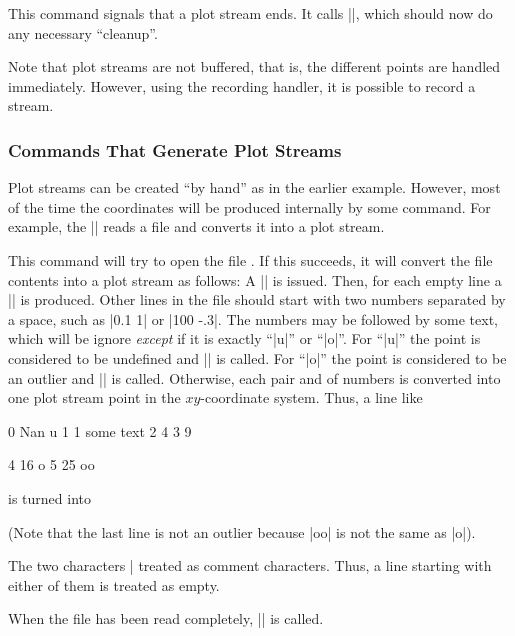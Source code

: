 \begin{command}{\pgfplotstreamend}
    This command signals that a plot stream ends. It calls
    |\pgf@plotstreamend|, which should now do any necessary ``cleanup''.
\end{command}

Note that plot streams are not buffered, that is, the different points are
handled immediately. However, using the recording handler, it is possible to
record a stream.


\subsubsection{Commands That Generate Plot Streams}
\label{section-plot-jumps}

Plot streams can be created ``by hand'' as in the earlier example. However,
most of the time the coordinates will be produced internally by some command.
For example, the |\pgfplotxyfile| reads a file and converts it into a plot
stream.

\begin{command}{\pgfplotxyfile{}}
    This command will try to open the file . If this succeeds,
    it will convert the file contents into a plot stream as follows: A
    |\pgfplotstreamstart| is issued. Then, for each empty line a
    |\pgfplotstreamnewdataset| is produced. Other lines in the file should
    start with two numbers separated by a space, such as |0.1 1| or |100 -.3|.
    The numbers may be followed by some text, which will be ignore
    \emph{except} if it is exactly ``|u|'' or ``|o|''. For ``|u|'' the point
    is considered to be undefined and |\pgfplotstreampointundefined| is called.
    For ``|o|'' the point is considered to be an outlier and
    |\pgfplotstreampointoutlier| is called. Otherwise, each pair  and
     of numbers is converted into one plot stream point in the
    $xy$-coordinate system. Thus, a line like
\begin{codeexample}[code only, tikz syntax=false]
0 Nan u
1 1 some text
2 4
3 9

4 16 o
5 25 oo
\end{codeexample}
    is turned into
\begin{codeexample}
\pgfplotstreamstart
\pgfplotstreampointundefined
{}
\pgfplotstreamnewdataset
{}
\pgfplotstreamend
\end{codeexample}
    (Note that the last line is not an outlier because |oo| is not the same as
    |o|).

    The two characters |%
    treated as comment characters. Thus, a line starting with either of them is
    treated as empty.

    When the file has been read completely, |\pgfplotstreamend| is called.
\end{command}


